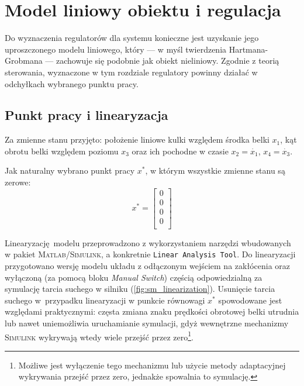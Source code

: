 \chapter{Model liniowy obiektu i regulacja}
\label{cha:ch5_model_liniowy}

Do wyznaczenia regulatorów dla systemu konieczne jest uzyskanie jego uproszczonego modelu liniowego, który --- w myśl twierdzenia Hartmana-Grobmana --- zachowuje się podobnie jak obiekt nieliniowy. Zgodnie z teorią sterowania, wyznaczone w tym rozdziale regulatory powinny działać w odchyłkach wybranego punktu pracy.

\section{Punkt pracy i linearyzacja}
\label{sec:ch5_punkt_pracy_linearyzacja}

Za zmienne stanu przyjęto: położenie liniowe kulki względem środka belki $x_1$, kąt obrotu belki względem poziomu $x_3$ oraz ich pochodne w czasie $x_2 = \dot{x_1}$, $x_4 = \dot{x_3}$.


Jak naturalny wybrano punkt pracy $x^*$, w którym wszystkie zmienne stanu są zerowe:
\begin{equation}
    x^* = \begin{bmatrix}
    0 \\
    0 \\
    0 \\
    0 \\
    \end{bmatrix}
\end{equation}

Linearyzację modelu przeprowadzono z wykorzystaniem narzędzi wbudowanych w pakiet \textsc{Mat\-lab/Si\-mu\-link}, a konkretnie \texttt{Linear Analysis Tool}. Do linearyzacji przygotowano wersję modelu układu z odłączonym wejściem na zakłócenia oraz wyłączoną (za pomocą bloku \textit{Manual Switch}) częścią odpowiedzialną za symulację tarcia suchego w silniku (\cref{fig:sm_linearization}). Usunięcie tarcia suchego w~przypadku linearyzacji w punkcie równowagi $x^*$ spowodowane jest względami praktycznymi: częsta zmiana znaku prędkości obrotowej belki utrudnia lub nawet uniemożliwia uruchamianie symulacji, gdyż wewnętrzne mechanizmy \textsc{Simulink} wykrywają wtedy wiele przejść przez zero\footnote{Możliwe jest wyłączenie tego mechanizmu lub użycie metody adaptacyjnej wykrywania przejść przez zero, jednakże spowalnia to symulację.}.

